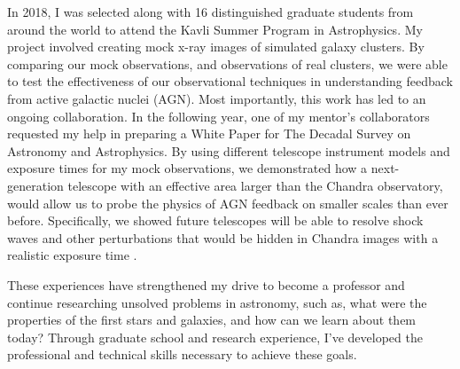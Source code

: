 \documentclass[letterpaper, 12pt]{article}
\begin{document}
In 2018, I was selected along with 16 distinguished graduate students from around the world to attend the Kavli Summer Program in Astrophysics. My project involved creating mock x-ray images of simulated galaxy clusters. By comparing our mock observations, and observations of real clusters, we were able to test the effectiveness of our observational techniques in understanding feedback from active galactic nuclei (AGN). Most importantly, this work has led to an ongoing collaboration. In the following year, one of my mentor's collaborators requested my help in preparing a White Paper for The Decadal Survey on Astronomy and Astrophysics. By using different telescope instrument models and exposure times for my mock observations, we demonstrated how a next-generation telescope with an effective area larger than the Chandra observatory, would allow us to probe the physics of AGN feedback on smaller scales than ever before. Specifically, we showed future telescopes will be able to resolve shock waves and other perturbations that would be hidden in Chandra images with a realistic exposure time \citep{WP_Ruszkowski2019}. 

These experiences have strengthened my drive to become a professor and continue researching unsolved problems in astronomy, such as, what were the properties of the first stars and galaxies, and how can we learn about them today? Through graduate school and research experience, I've developed the professional and technical skills necessary to achieve these goals.



  
\end{document}
